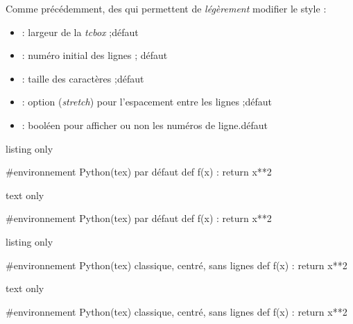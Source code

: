 \begin{cautionblock}
Comme précédemment, des  qui permettent de \textit{légèrement} modifier le style :

\begin{itemize}
	\item {} : largeur de la \textit{tcbox} ;\hfill{}défaut 
	\item {} : numéro initial des lignes ; \hfill{}défaut 
	\item {} : taille des caractères ;\hfill{}défaut 
	\item {} : option (\textit{stretch}) pour l'espacement entre les lignes ;\hfill{}défaut 
	\item {} : booléen pour afficher ou non les numéros de ligne.\hfill{}défaut 
\end{itemize}
\vspace*{-\baselineskip}\leavevmode
\end{cautionblock}

\begin{PresCodeTexPL}{listing only}
\begin{CodePythontex}{} %
	#environnement Python(tex) par défaut
	def f(x) :
		return x**2
\end{CodePythontex}
\end{PresCodeTexPL}

\begin{PresCodeSortiePL}{text only}
\begin{CodePythontex}{}
	#environnement Python(tex) par défaut
	def f(x) :
		return x**2
\end{CodePythontex}
\end{PresCodeSortiePL}

\begin{PresCodeTexPL}{listing only}
\begin{CodePythontexAlt}[Largeur=12cm,Centre,Lignes=false]{}
	#environnement Python(tex) classique, centré, sans lignes
	def f(x) :
		return x**2
\end{CodePythontexAlt}
\end{PresCodeTexPL}

\begin{PresCodeSortiePL}{text only}
\begin{CodePythontexAlt}[Largeur=12cm,Centre,Lignes=false]{}
	#environnement Python(tex) classique, centré, sans lignes
	def f(x) :
		return x**2
\end{CodePythontexAlt}
\end{PresCodeSortiePL}

